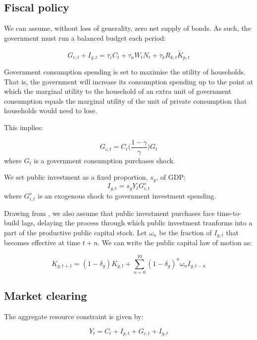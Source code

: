 \documentclass[titlepage, 11pt, a4paper]{article}
\renewcommand{\&}{and}
\begin{document}
\begin{appendices}
\subsection{Fiscal policy}


We can assume, without loss of generality, zero net supply of bonds. As such, the government must run a balanced budget each period: 

\begin{equation} \label{gov_BC}
    G_{c,t} + I_{g,t} = \tau_c C_t + \tau_nW_tN_t + \tau_kR_{k,t}\tilde{K}_{p,t}
\end{equation}

Government consumption spending is set to maximise the utility of households. That is, the government will increase its consumption spending up to the point at which the marginal utility to the household of an extra unit of government consumption equals the marginal utility of the unit of private consumption that households would need to lose.  

This implies: 

\begin{equation}\label{GC}
G_{c,t} = C_t\Big(\frac{1-\gamma}{\gamma} \Big)G_t
    \end{equation}
where $G_t$ is a government consumption purchases shock.

We set public investment as a fixed proportion, $s_g$, of GDP: 
\begin{equation}\label{GI}
    I_{g,t} = s_gY_tG^s_{i,t}
\end{equation}
where $G^s_{i,t}$ is an exogenous shock to government investment spending.


Drawing from \cite{Suresh24}, we also assume that public investment purchases face time-to-build lags, delaying the process through which public investment tranforms into a part of the productive public capital stock. Let $\omega_n$ be the fraction of $I_{g,t}$ that becomes effective at time $t+n$. We can write the public capital law of motion as:

\begin{equation}
    \label{public_LOM_2}
    K_{g,t+1} = (1-\delta_g)K_{g,t} + \sum_{n=0}^{10}(1-\delta_g)^n \omega_n I_{g,t-n}
\end{equation}



\subsection{Market clearing}
The aggregate resource constraint is given by: 

\begin{equation}
    Y_t = C_t + I_{p,t} + G_{c,t} + I_{g,t}
\end{equation}

\end{appendices}
\end{document}
